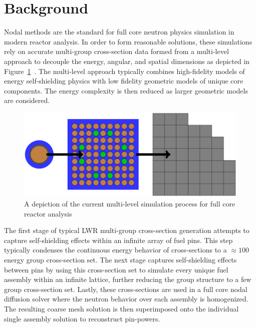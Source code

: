 \section{Background}
\label{sec:chap1-background}

Nodal methods are the standard for full core neutron physics simulation in modern reactor analysis. In order to form reasonable solutions, these simulations rely on accurate multi-group cross-section data formed from a multi-level approach to decouple the energy, angular, and spatial dimensions as depicted in Figure~\ref{fig:multi-level}~\cite{boyd2017thesis}. The multi-level approach typically combines high-fidelity models of energy self-shielding physics with low fidelity geometric models of unique core components. The energy complexity is then reduced as larger geometric models are considered.

\begin{figure}[ht!]
	\centering
	\includegraphics[width=\linewidth]{figures/intro/multi-step-flow-chart.png}
	\caption{A depiction of the current multi-level simulation process for full core reactor analysis}
	\label{fig:multi-level}
\end{figure}

The first stage of typical \ac{LWR} multi-group cross-section generation attempts to capture self-shielding effects within an infinite array of fuel pins. This step typically condenses the continuous energy behavior of cross-sections to a $\approx 100$ energy group cross-section set. The next stage captures self-shielding effects between pins by using this cross-section set to simulate every unique fuel assembly within an infinite lattice, further reducing the group structure to a few group cross-section set. Lastly, these cross-sections are used in a full core nodal diffusion solver where the neutron behavior over each assembly is homogenized. The resulting coarse mesh solution is then superimposed onto the individual single assembly solution to reconstruct pin-powers.

